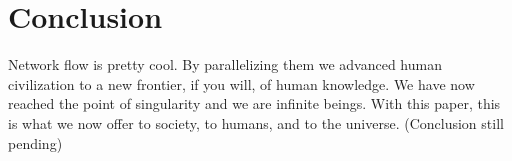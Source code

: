 \section{Conclusion}
Network flow is pretty cool. By parallelizing them we advanced human civilization to a new frontier, if you will, of human knowledge. We have now reached the point of singularity and we are infinite beings. With this paper, this is what we now offer to society, to humans, and to the universe. (Conclusion still pending)